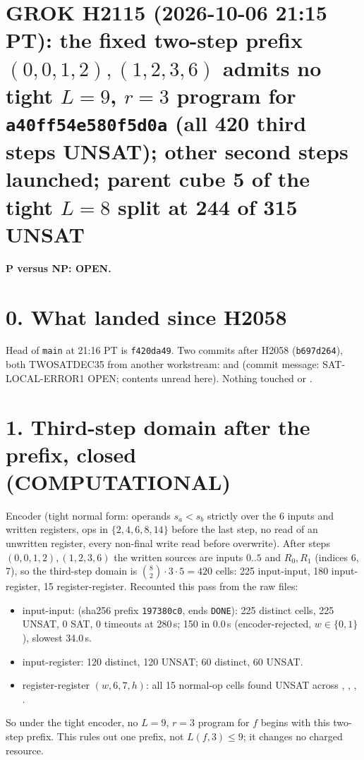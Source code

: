 \documentclass[11pt]{article}
\begin{document}
\sloppy
\section*{GROK H2115 (2026-10-06 21:15 PT): the fixed two-step prefix $(0,0,1,2),(1,2,3,6)$ admits no tight $L=9$, $r=3$ program for \texttt{a40ff54e580f5d0a} (all 420 third steps UNSAT); other second steps launched; parent cube 5 of the tight $L=8$ split at 244 of 315 UNSAT}
\textbf{P versus NP: OPEN.}

\section*{0. What landed since H2058}
Head of \texttt{main} at 21:16 PT is \texttt{f420da49}. Two commits after H2058 (\texttt{b697d264}), both TWOSATDEC35 from another workstream:  and  (commit message: SAT-LOCAL-ERROR1 OPEN; contents unread here). Nothing touched  or .

\section*{1. Third-step domain after the prefix, closed (COMPUTATIONAL)}
Encoder  (tight normal form: operands $s_a<s_b$ strictly over the 6 inputs and written registers, ops in $\{2,4,6,8,14\}$ before the last step, no read of an unwritten register, every non-final write read before overwrite). After steps $(0,0,1,2),(1,2,3,6)$ the written sources are inputs $0..5$ and $R_0,R_1$ (indices 6, 7), so the third-step domain is $\binom{8}{2}\cdot 3\cdot 5=420$ cells: 225 input-input, 180 input-register, 15 register-register. Recounted this pass from the raw files:
\begin{itemize}
\item input-input:  (sha256 prefix \texttt{197380c0}, ends \texttt{DONE}): 225 distinct cells, 225 UNSAT, 0 SAT, 0 timeouts at 280\,s; 150 in 0.0\,s (encoder-rejected, $w\in\{0,1\}$), slowest 34.0\,s.
\item input-register:  120 distinct, 120 UNSAT;  60 distinct, 60 UNSAT.
\item register-register $(w,6,7,h)$: all 15 normal-op cells found UNSAT across , , , .
\end{itemize}
So under the tight encoder, no $L=9$, $r=3$ program for $f$ begins with this two-step prefix. This rules out one prefix, not $L(f,3)\le 9$; it changes no charged resource.
\end{document}
